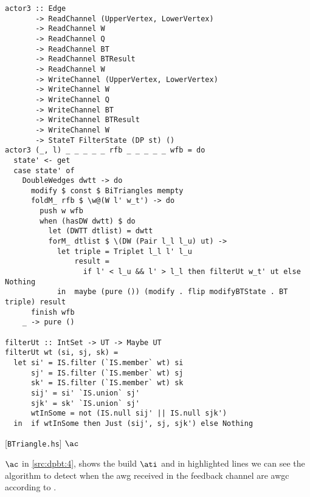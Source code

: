 \begin{listing}[H]
\begin{verbatim}      
actor3 :: Edge
       -> ReadChannel (UpperVertex, LowerVertex)
       -> ReadChannel W
       -> ReadChannel Q
       -> ReadChannel BT
       -> ReadChannel BTResult
       -> ReadChannel W
       -> WriteChannel (UpperVertex, LowerVertex)
       -> WriteChannel W
       -> WriteChannel Q
       -> WriteChannel BT
       -> WriteChannel BTResult
       -> WriteChannel W
       -> StateT FilterState (DP st) ()
actor3 (_, l) _ _ _ _ _ rfb _ _ _ _ _ wfb = do
  state' <- get
  case state' of
    DoubleWedges dwtt -> do
      modify $ const $ BiTriangles mempty
      foldM_ rfb $ \w@(W l' w_t') -> do
        push w wfb
        when (hasDW dwtt) $ do
          let (DWTT dtlist) = dwtt
          forM_ dtlist $ \(DW (Pair l_l l_u) ut) ->
            let triple = Triplet l_l l' l_u
                result =
                  if l' < l_u && l' > l_l then filterUt w_t' ut else Nothing
            in  maybe (pure ()) (modify . flip modifyBTState . BT triple) result
      finish wfb
    _ -> pure ()

filterUt :: IntSet -> UT -> Maybe UT
filterUt wt (si, sj, sk) =
  let si' = IS.filter (`IS.member` wt) si 
      sj' = IS.filter (`IS.member` wt) sj
      sk' = IS.filter (`IS.member` wt) sk
      sij' = si' `IS.union` sj'
      sjk' = sk' `IS.union` sj'
      wtInSome = not (IS.null sij' || IS.null sjk')
  in  if wtInSome then Just (sij', sj, sjk') else Nothing
\end{verbatim}
\caption{[\texttt{BTriangle.hs}] $\ac$}
\label{src:dpbt:4}
\end{listing}

$\ac$ in \autoref{src:dpbt:4}, shows the build $\ati$ and in highlighted lines we can see the algorithm to detect when the \acrshort{awg}
received in the feedback channel are \acrshort{awgc} according to .

